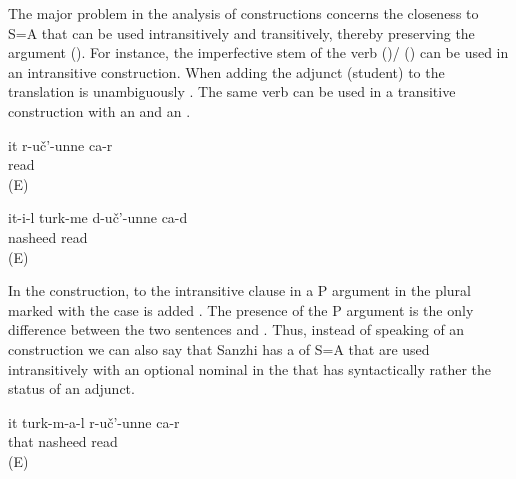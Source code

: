 The major problem in the analysis of  constructions concerns the closeness to S=A  that can be used intransitively and transitively, thereby preserving the  argument (). For instance, the imperfective stem of the verb  ()\slash{} ()  can be used in an intransitive construction. When adding the  adjunct  (student) to  the translation is unambiguously . The same verb can be used in a transitive construction with an   and an   .
%
\begin{exe}
	\ex	\label{ex:She reads / studies}
	\gll	it	r-uč'-unne	ca-r\\
			read	\\
	\glt	{} (E)

	\ex	\label{ex:S/he reads (i.e. sings) nasheeds@varA}
	\gll	it-i-l	turk-me	d-uč'-unne	ca-d\\
			nasheed	read	\\
	\glt	{} (E)
\end{exe}

In the  construction, to the intransitive clause in  a P argument in the plural marked with the  case is added . The presence of the P argument is the only difference between the two sentences  and . Thus, instead of speaking of an  construction we can also say that Sanzhi has a  of S=A  that are used intransitively with an optional nominal in the  that has syntactically rather the status of an adjunct.
%
\begin{exe}
	\ex	\label{ex:She reads (i.e. sings) nasheeds@varB}
	\gll	it	turk-m-a-l	r-uč'-unne	ca-r\\
		that	nasheed	read	\\
	\glt	{} (E)
\end{exe}

